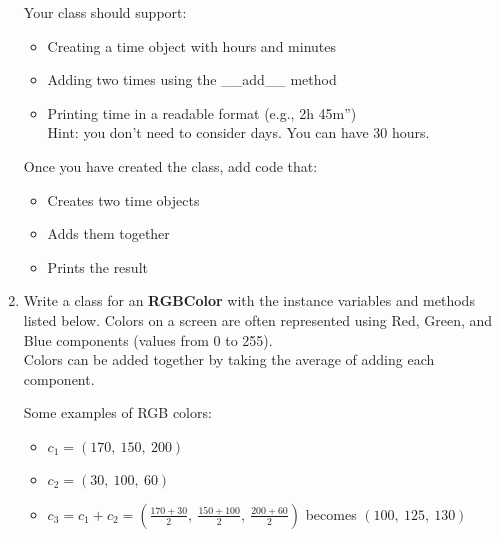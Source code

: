\documentclass{article}
\newcommand{\csq}[1]{\reflectbox{''}#1''}  %
\begin{document}
\begin{enumerate}
		Your class should support:
		\begin{itemize}
			\item Creating a time object with hours and minutes
			\item Adding two times using the \_\_add\_\_ method 
			\item Printing time in a readable format (e.g., \csq{2h 45m})\\
				Hint: you don't need to consider days. You can have 30 hours.
		\end{itemize}

		Once you have created the class, add code that:
		\begin{itemize}
			\item Creates two time objects
			\item Adds them together
			\item Prints the result
		\end{itemize}



	\item
		Write a class for an \textbf{RGBColor} with the instance variables and methods listed 
		below. Colors on a screen are often represented using Red, Green, and Blue components 
		(values from 0 to 255).\\
		Colors can be added together by taking the average of adding each component.

		\begin{minipage}[t]{0.7\textwidth}
			Some examples of RGB colors:
			\begin{itemize}
				\item $c_1 = (170,\ 150,\ 200)$
				\item $c_2 = (30,\ 100,\ 60)$
				\item $c_3 = c_1 + c_2 = (\frac{170+30}{2},\ \frac{150+100}{2},\ \frac{200+60}{2})$ 
					becomes $(100,\ 125,\ 130)$
			\end{itemize}
		

\end{minipage}
\end{enumerate}
\end{document}
